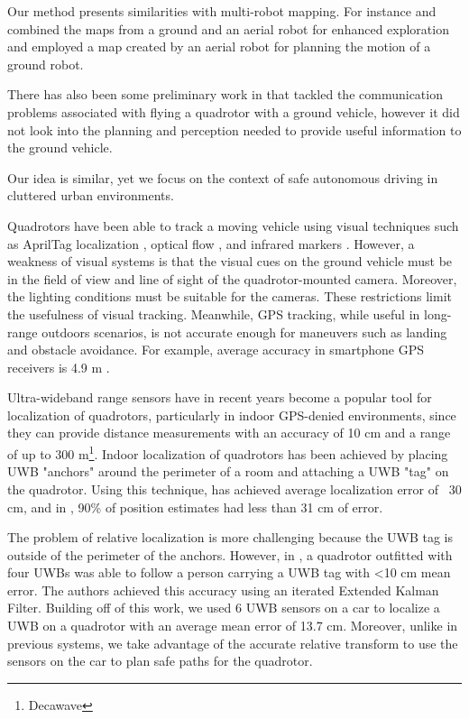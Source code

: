 Our method presents similarities with multi-robot mapping. For instance \cite{Michael:2012gl} and \cite{Forster:2013kn} combined the maps from a ground and an aerial robot for enhanced exploration and \cite{Delmerico:2017vq} employed a map created by an aerial robot for planning the motion of a ground robot.

There has also been some preliminary work in \cite{nasser2015fleye} that tackled the communication problems associated with flying a quadrotor with a ground vehicle, however it did not look into the planning and perception needed to provide useful information to the ground vehicle.

Our idea is similar, yet we focus on the context of safe autonomous driving in cluttered urban environments.

Quadrotors have been able to track a moving vehicle using visual techniques
such as AprilTag localization \cite{borowczyk2016autonomous}, optical flow \cite{herisse2012landing},
and infrared markers \cite{wenzel2011automatic}. However, a weakness of visual systems
is that the visual cues on the ground vehicle must be in the field of view and line
of sight of the quadrotor-mounted camera. Moreover, the lighting conditions must be suitable
for the cameras. These restrictions limit the usefulness of visual tracking. Meanwhile,
GPS tracking, while useful in long-range outdoors scenarios, is not accurate enough for 
maneuvers such as landing and obstacle avoidance. For example, average accuracy in
smartphone GPS receivers is 4.9 m \cite{gpsaccuracy}.

Ultra-wideband range sensors have in recent years become a popular tool for
localization of quadrotors, particularly in indoor GPS-denied environments, since they can
provide distance measurements with an accuracy of 10 cm and a range of
up to 300 m\footnote{Decawave}.  Indoor localization of quadrotors has been
achieved by placing UWB "anchors" around the perimeter of a room and attaching
a UWB "tag" on the quadrotor.  Using this technique, \cite{mueller2015fusing}
has achieved average localization error of ~30 cm, and in
\cite{kempke2016harmonium}, 90\% of position estimates had less than 31 cm of error.

The problem of relative localization is more challenging because the UWB tag is outside of
the perimeter of the anchors. However, in \cite{tobiuwb}, a quadrotor
outfitted with four UWBs was able to follow a person carrying a UWB tag
with <10 cm mean error. The authors achieved this accuracy using an
iterated Extended Kalman Filter. Building off of this work, we used
6 UWB sensors on a car to localize a UWB on a quadrotor with an
average mean error of 13.7 cm. Moreover, unlike in previous systems,
we take advantage of the accurate relative transform to use the sensors
on the car to plan safe paths for the quadrotor.

